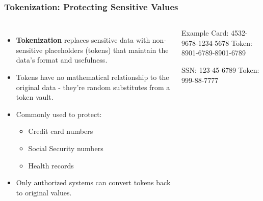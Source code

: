 \documentclass{beamer}
\begin{document}
\begin{frame}
    \frametitle{Tokenization: Protecting Sensitive Values}

    \begin{columns}[t]
            \begin{itemize}
                \item \textbf{Tokenization} replaces sensitive data with non-sensitive placeholders (tokens) that maintain the data's format and usefulness.
                
                \item Tokens have no mathematical relationship to the original data - they're random substitutes from a token vault.
                
                \item Commonly used to protect:
                    \begin{itemize}
                        \item Credit card numbers
                        \item Social Security numbers
                        \item Health records
                    \end{itemize}
                
                \item Only authorized systems can convert tokens back to original values.
            \end{itemize}
            
            \begin{alertblock}{Example}
                Card: 4532-9678-1234-5678
                Token: 8901-6789-8901-6789
                
                SSN: 123-45-6789
                Token: 999-88-7777
            \end{alertblock}
    \end{columns}
\end{frame}
\end{document}
